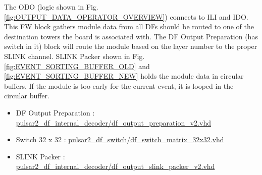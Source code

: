 \documentclass[11pt,letterpaper]{article}
\begin{document}
The ODO (logic shown in Fig. \ref{fig:OUTPUT_DATA_OPERATOR_OVERVIEW}) connects to ILI and IDO. This FW block gathers module data from all DFs should be routed to one of the destination towers the board is associated with. The DF Output Preparation (has switch in it) block will route the module based on the layer number to the proper SLINK channel. SLINK Packer shown in Fig. \ref{fig:EVENT_SORTING_BUFFER_OLD} and \ref{fig:EVENT_SORTING_BUFFER_NEW} holds the module data in circular buffers. If the module is too early for the current event, it is looped in the circular buffer. 

\begin{itemize}
\item DF Output Preparation : \url{pulsar2_df_internal_decoder/df_output_preparation_v2.vhd}
\item Switch 32 x 32 : \url{pulsar2_df_switch/df_switch_matrix_32x32.vhd}
\item SLINK Packer : \url{pulsar2_df_internal_decoder/df_output_slink_packer_v2.vhd}
\end{itemize}
\end{document}

